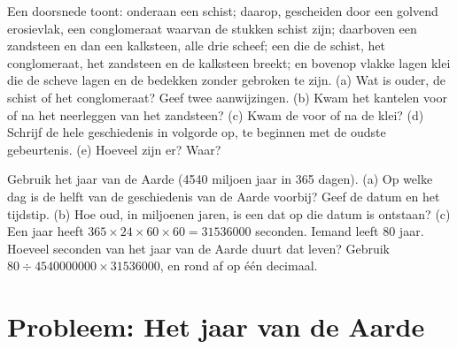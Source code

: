 \begin{exercise}[$\star\star\star$]\label{exo:g7:geological-time:11}
Een doorsnede toont: onderaan een schist; daarop, gescheiden door een
golvend erosievlak, een conglomeraat waarvan de  stukken schist zijn;
daarboven een zandsteen en dan een kalksteen, alle drie scheef; een 
die de schist, het conglomeraat, het zandsteen en de kalksteen breekt; en
bovenop vlakke lagen klei die de scheve lagen en de  bedekken zonder
gebroken te zijn. (a) Wat is ouder, de schist of het conglomeraat? Geef twee
aanwijzingen. (b) Kwam het kantelen voor of na het neerleggen van het
zandsteen? (c) Kwam de  voor of na de klei? (d) Schrijf de hele
geschiedenis in volgorde op, te beginnen met de oudste gebeurtenis. (e)
Hoeveel  zijn er? Waar?
\end{exercise}

\begin{exercise}[$\star\star\star$]\label{exo:g7:geological-time:12}
Gebruik het jaar van de Aarde (\num{4540} miljoen jaar in 365 dagen). (a) Op
welke dag is de helft van de geschiedenis van de Aarde voorbij? Geef de
datum en het tijdstip. (b) Hoe oud, in miljoenen jaren, is een 
dat op die datum is ontstaan? (c) Een jaar heeft
$365 \times 24 \times 60 \times 60 = \num{31536000}$ seconden. Iemand leeft
80 jaar. Hoeveel seconden van het jaar van de Aarde duurt dat leven? Gebruik
$80 \div \num{4540000000} \times
\num{31536000}$, en rond af op één decimaal.
\end{exercise}

\section{Probleem: Het jaar van de Aarde}

